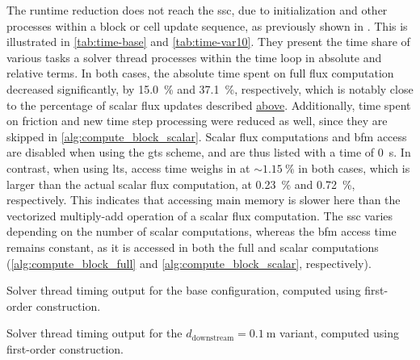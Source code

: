 The runtime reduction does not reach the \gls{ssc}, due to initialization and other processes within a block or cell update sequence, as previously shown in \textcite{crossley2003}. 
This is illustrated in \autoref{tab:time-base} and \autoref{tab:time-var10}. 
They present the time share of various tasks a solver thread processes within the time loop in absolute and relative terms.
In both cases, the absolute time spent on full flux computation decreased significantly, by \SI{15.0}{\percent} and \SI{37.1}{\percent}, respectively, which is notably close to the percentage of scalar flux updates described 
\hyperlink{scalar-update-perc}{above}.
Additionally, time spent on friction and new time step processing were reduced as well, since they are 
skipped in \autoref{alg:compute_block_scalar}.
Scalar flux computations and \gls{bfm} access are disabled when using the \gls{gts} scheme, and are thus listed with a time of \SI{0}{\second}. 
In contrast, when using \gls{lts}, access time weighs in at $\sim\! \SI{1.15}{\percent}$ in both cases, which is larger than the actual scalar flux computation, at \SI{0.23}{\percent} and \SI{0.72}{\percent}, respectively.
This indicates that accessing main memory is slower here than the vectorized multiply-add operation of a scalar flux computation.
The \gls{ssc} varies depending on the number of scalar computations, whereas the \gls{bfm} access time remains constant, as it is accessed in both the full and scalar computations (\autoref{alg:compute_block_full} and \autoref{alg:compute_block_scalar}, respectively).

\begin{table}[p]
  \caption{
    Solver thread timing output for the base configuration, computed using first-order construction.
  }
  \label{tab:time-base}
  \small
  \centering
  
\end{table}

\begin{table}[p]
  \caption{
    Solver thread timing output for the $d_{\text{downstream}} = \SI{0.1}{\meter}$ variant, computed using first-order construction.
  }
  \label{tab:time-var10}
  \small
  \centering
  
\end{table}

